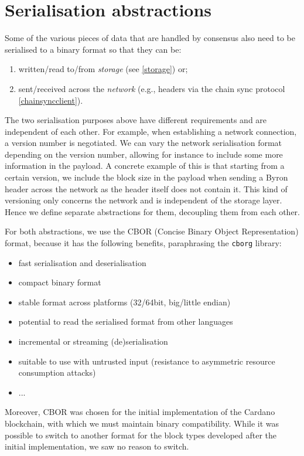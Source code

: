 \chapter{Serialisation abstractions}
\label{serialisation}

Some of the various pieces of data that are handled by consensus also need to be
serialised to a binary format so that they can be:

\begin{enumerate}
\item written/read to/from \emph{storage} (see \cref{storage}) or;
\item sent/received across the \emph{network} (e.g., headers via the chain sync
  protocol \cref{chainsyncclient}).
\end{enumerate}

The two serialisation purposes above have different requirements and are
independent of each other. For example, when establishing a network connection,
a version number is negotiated. We can vary the network serialisation format
depending on the version number, allowing for instance to include some more
information in the payload. A concrete example of this is that starting from a
certain version, we include the block size in the payload when sending a
Byron header across the network as the header
itself does not contain it. This kind of versioning only concerns the network
and is independent of the storage layer. Hence we define separate abstractions
for them, decoupling them from each other.

For both abstractions, we use the CBOR (Concise Binary Object
Representation) format, because it has the following
benefits, paraphrasing the \texttt{cborg} library:
\begin{itemize}
\item fast serialisation and deserialisation
\item compact binary format
\item stable format across platforms (32/64bit, big/little endian)
\item potential to read the serialised format from other languages
\item incremental or streaming (de)serialisation
\item suitable to use with untrusted input (resistance to asymmetric resource consumption attacks)
\item ...
\end{itemize}
Moreover, CBOR was chosen for the initial implementation of the Cardano
blockchain, with which we must maintain binary compatibility.
While it was possible to switch to another format for the block types developed
after the initial implementation, we saw no reason to switch.

